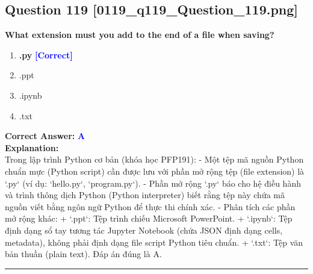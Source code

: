 \documentclass[11pt,a4paper]{article}
\begin{document}
\begin{minipage}{\textwidth}
\subsection*{Question 119 \quad \footnotesize{[0119_q119_Question_119.png]}}
\noindent \textbf{What extension must you add to the end of a file when saving?}

\begin{enumerate}[label=\Alph*.]
    \item \textbf{.py} \hfill \textcolor{blue}{\textbf{[Correct]}}
    \item .ppt
    \item .ipynb
    \item .txt
\end{enumerate}

\noindent \textbf{Correct Answer:} \textcolor{blue}{\textbf{A}} \\[4pt]
\noindent \textbf{Explanation:}\\
Trong lập trình Python cơ bản (khóa học PFP191):\newline
- Một tệp mã nguồn Python chuẩn mực (Python script) cần được lưu với phần mở rộng tệp (file extension) là `.py` (ví dụ: `hello.py`, `program.py`).\newline
- Phần mở rộng `.py` báo cho hệ điều hành và trình thông dịch Python (Python interpreter) biết rằng tệp này chứa mã nguồn viết bằng ngôn ngữ Python để thực thi chính xác.\newline
- Phân tích các phần mở rộng khác:\newline
  + `.ppt`: Tệp trình chiếu Microsoft PowerPoint.\newline
  + `.ipynb`: Tệp định dạng sổ tay tương tác Jupyter Notebook (chứa JSON định dạng cells, metadata), không phải định dạng file script Python tiêu chuẩn.\newline
  + `.txt`: Tệp văn bản thuần (plain text).\newline
Đáp án đúng là A.
\end{minipage}
\vspace{0.8cm}
\hrule
\vspace{0.5cm}
\end{document}
